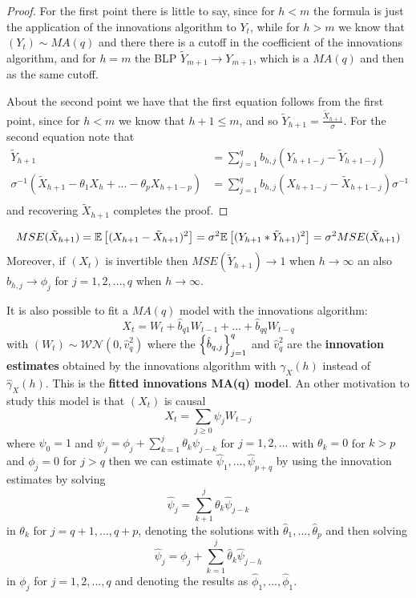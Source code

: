 \begin{proof}
    For the first point there is little to say, since for $h<m$ the formula is just the application of the innovations algorithm to $Y_t$, while for $h>m$ we know that $(Y_t)\sim MA(q)$ and there there is a cutoff in the coefficient of the innovations algorithm, and for $h=m$ the BLP $\tilde{Y}_{m+1}\rightarrow Y_{m+1}$, which is a $MA(q)$ and then as the same cutoff. 
    
    About the second point we have that the first equation follows from the first point, since for $h<m$ we know that $h+1\le m$, and so $\tilde{Y}_{h+1}=\frac{\tilde{X}_{h+1}}{\sigma}$. For the second equation note that
    \begin{equation*}
        \begin{split}
            \tilde{Y}_{h+1}&=\sum_{j=1}^qb_{h,j}(Y_{h+1-j}-\tilde{Y}_{h+1-j})\\
            \sigma^{-1}(\tilde{X}_{h+1}-\theta_1X_h+...-\theta_pX_{h+1-p})&=\sum_{j=1}^qb_{h,j}(X_{h+1-j}-\tilde{X}_{h+1-j})\sigma^{-1}\\
        \end{split}
    \end{equation*}
    and recovering $\tilde{X}_{h+1}$ completes the proof.
\end{proof}

\begin{remark}
    \[
        MSE(\tilde{X}_{h+1})=\mathbb{E}\left[(X_{h+1}-\tilde{X}_{h+1})^2\right]=\sigma^2\mathbb{E}\left[(Y_{h+1}*\tilde{Y}_{h+1})^2\right]=\sigma^2MSE(\tilde{X}_{h+1}) 
    \]
    Moreover, if $(X_t)$ is invertible then $MSE(\tilde{Y}_{h+1})\to1$ when $h\to\infty$ an also $b_{h,j}\to\phi_j$ for $j=1,2,...,q$ when $h\to\infty$.
\end{remark}

It is also possible to fit a $MA(q)$ model with the innovations algorithm:
\[
    X_t=W_t+\hat{b}_{q1}W_{t-1}+...+\hat{b}_{qq}W_{t-q}    
\]
with $(W_t)\sim\mathcal{WN}(0,\hat{v}_q^2)$ where the $\left\{\hat{b}_{q,j}\right\}_{j=1}^q$ and $\hat{v}_q^2$ are the \textbf{innovation estimates} obtained by the innovations algorithm with $\gamma_X(h)$ instead of $\hat{\gamma}_X(h)$. This is the \textbf{fitted innovations MA(q) model}. An other motivation to study this model is that $(X_t)$ is causal
\[
    X_t=\sum_{j\ge0}\psi_jW_{t-j}  
\]
where $\psi_0=1$ and $\psi_j=\phi_j+\sum_{k=1}^j\theta_k\psi_{j-k}$ for $j=1,2,...$ with $\theta_k=0$ for $k>p$ and $\phi_j=0$ for $j>q$ then we can estimate $\hat{\psi}_1,...,\hat{\psi}_{p+q}$ by using the innovation estimates by solving
\[
    \hat{\psi}_j=\sum_{k+1}^j\theta_k\hat{\psi}_{j-k} 
\]
in $\theta_k$ for $j=q+1,...,q+p$, denoting the solutions with $\hat{\theta}_1,...,\hat{\theta}_p$ and then solving
\[
    \hat{\psi}_j=\phi_j+\sum_{k=1}^j\hat{\theta}_k\hat{\psi}_{j-h}  
\]
in $\phi_j$ for $j=1,2,...,q$ and denoting the results as $\hat{\phi}_1,...,\hat{\phi}_1$.

